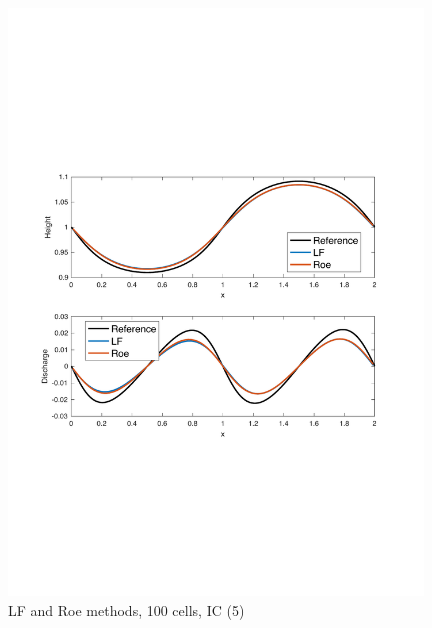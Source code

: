 \documentclass[11pt,a4paper]{article}
\begin{document}
\begin{figure}[!htb]
    \centering
    \includegraphics[width=11cm]{pictures/IC_2_100_cells.pdf}
    \caption{LF and Roe methods, 100 cells, IC (5)}
    \label{fig:IC_2_100_cells}
\end{figure}
\end{document}
